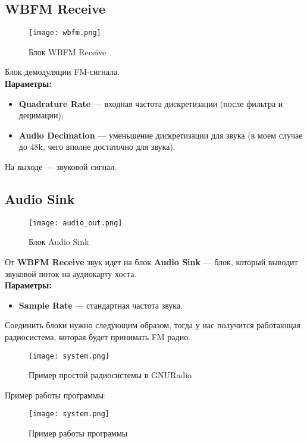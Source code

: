 \subsection*{\textbf{WBFM Receive}}

\begin{figure}[H]
    \centering
    \texttt{[image: wbfm.png]}
    \caption{Блок WBFM Receive}
\end{figure}

Блок демодуляции FM-сигнала. \\

\textbf{Параметры:}

\begin{itemize}
    \item \textbf{Quadrature Rate} — входная частота дискретизации (после фильтра и децимации);
    \item \textbf{Audio Decimation} — уменьшение дискретизации для звука (в моем случае до 48k, чего вполне достаточно для звука).
\end{itemize}

На выходе — звуковой сигнал.

\subsection*{\textbf{Audio Sink}}

\begin{figure}[H]
    \centering
    \texttt{[image: audio\_out.png]}
    \caption{Блок Audio Sink}
\end{figure}

От \textbf{WBFM Receive} звук идет на блок \textbf{Audio Sink} — блок, который выводит звуковой поток на аудиокарту хоста. \\

\textbf{Параметры:}

\begin{itemize}
    \item \textbf{Sample Rate} — стандартная частота звука.
\end{itemize}

Соединить блоки нужно следующим образом, тогда у нас получится работающая радиосистема, которая будет принимать FM радио.

\begin{figure}[H]
    \centering
    \texttt{[image: system.png]}
    \caption{Пример простой радиосистемы в GNURadio}
\end{figure}

Пример работы программы:

\begin{figure}[H]
    \centering
    \texttt{[image: system.png]}
    \caption{Пример работы программы}
\end{figure}

